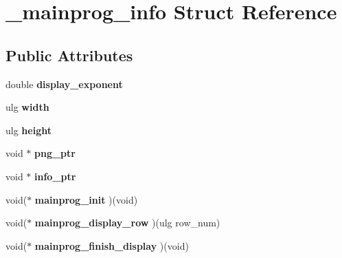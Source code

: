 \hypertarget{struct__mainprog__info}{\section{\+\_\+mainprog\+\_\+info Struct Reference}
\label{struct__mainprog__info}
}
\subsection*{Public Attributes}
\begin{DoxyCompactItemize}
\item 
\hypertarget{struct__mainprog__info_acc432fe80c5761bb0fb27c03a346b1f8}{double {\bfseries display\+\_\+exponent}}\label{struct__mainprog__info_acc432fe80c5761bb0fb27c03a346b1f8}

\item 
\hypertarget{struct__mainprog__info_a83eef09db07997f02e0e612663c23336}{ulg {\bfseries width}}\label{struct__mainprog__info_a83eef09db07997f02e0e612663c23336}

\item 
\hypertarget{struct__mainprog__info_aa45625593a0a10fb670c7421f4fabe6b}{ulg {\bfseries height}}\label{struct__mainprog__info_aa45625593a0a10fb670c7421f4fabe6b}

\item 
\hypertarget{struct__mainprog__info_ac0702618113cdf0fbd33d52088911650}{void $\ast$ {\bfseries png\+\_\+ptr}}\label{struct__mainprog__info_ac0702618113cdf0fbd33d52088911650}

\item 
\hypertarget{struct__mainprog__info_a0c4e34a41ce837b509bad44e728bb6fc}{void $\ast$ {\bfseries info\+\_\+ptr}}\label{struct__mainprog__info_a0c4e34a41ce837b509bad44e728bb6fc}

\item 
\hypertarget{struct__mainprog__info_a01ac80d404a2d6c63751eb024c29313f}{void($\ast$ {\bfseries mainprog\+\_\+init} )(void)}\label{struct__mainprog__info_a01ac80d404a2d6c63751eb024c29313f}

\item 
\hypertarget{struct__mainprog__info_a50e13ef970a90950dad70036dbd9ae91}{void($\ast$ {\bfseries mainprog\+\_\+display\+\_\+row} )(ulg row\+\_\+num)}\label{struct__mainprog__info_a50e13ef970a90950dad70036dbd9ae91}

\item 
\hypertarget{struct__mainprog__info_ab88fd83e8bfffb3e0e80a821781679b9}{void($\ast$ {\bfseries mainprog\+\_\+finish\+\_\+display} )(void)}\label{struct__mainprog__info_ab88fd83e8bfffb3e0e80a821781679b9}


\end{DoxyCompactItemize}
